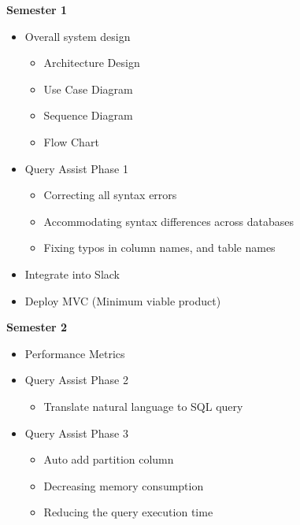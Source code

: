 \textbf{Semester 1}
\begin{itemize}
    \item  Overall system design
    \begin{itemize}
        \item Architecture Design
        \item Use Case Diagram
        \item Sequence Diagram
        \item Flow Chart
    \end{itemize}

    \item  Query Assist Phase 1
    \begin{itemize}
        \item Correcting all syntax errors
        \item Accommodating syntax differences across databases
        \item Fixing typos in column names, and table names
    \end{itemize}

    \item  Integrate into Slack
    \item Deploy MVC (Minimum viable product)
\end{itemize}
\pagebreak
\textbf{Semester 2}
\begin{itemize}
    \item  Performance Metrics

    \item  Query Assist Phase 2
    \begin{itemize}
        \item Translate natural language to SQL query
    \end{itemize}

    \item Query Assist Phase 3
    \begin{itemize}
        \item Auto add partition column
        \item Decreasing memory consumption
        \item Reducing the query execution time
    \end{itemize}
\end{itemize}
\pagebreak
